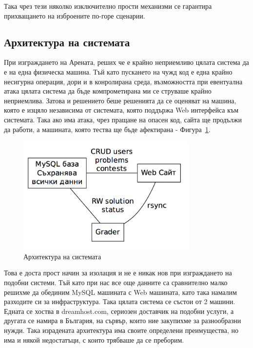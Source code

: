 \documentclass[a4paper,12pt]{article}
\begin{document}
  Така чрез тези няколко изключително прости механизми се гарантира прихващането на изброените по-горе сценарии.
  
  \subsection{Архитектура на системата}
  При изграждането на Арената, реших че е крайно неприемливо цялата система да е
  на една физическа машина. Тъй като пускането на чужд код е една крайно несигурна операция, дори и в конролирана среда, възможността при евентуална атака цялата система да бъде компрометирана ми се струваше крайно неприемлива. Затова и решението беше решенията да се оценяват на машина, която е изцяло независима от системата, която поддържа Web интерфейса към системата. Така ако има атака, чрез пращане на опасен код, сайта ще продължи да работи, а машината, която тества ще бъде афектирана - Фигура~\ref{architecture}.
  
  \begin{figure}
    \begin{center}
      \includegraphics[width=0.8\textwidth]{architecture.png}
    \end{center}
    \caption{Архитектура на системата}
    \label{architecture}
  \end{figure}
  
  Това е доста прост начин за изолация и не е никак нов при изграждането на подобни системи. Тъй като при нас все още данните са сравнително малко решихме да обединим MySQL машината с Web машината, като така намалим разходите си за инфраструктура. Така цялата система се състои от 2 машини. Едната се хоства в dreamhost.com, сериозен доставчик на подобни услуги, а другата се намира в България, на сървър, които ние закупихме за разнообразни нужди. Така израдената архитектура има своите определени преимущества, но има и някой недостатъци, с които трябваше да се преборим.
  
\end{document}
